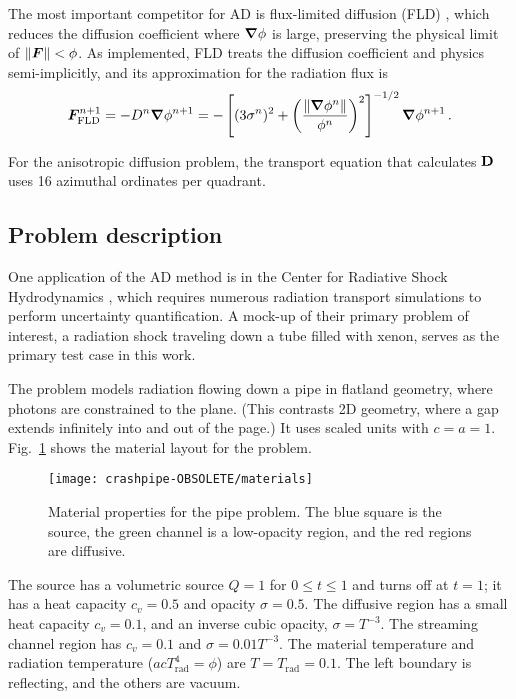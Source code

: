 \documentclass[11pt,letter,twoside]{mc2011}
\begin{document}
The most important competitor for AD is flux-limited diffusion (FLD)
\cite{Ols2000}, which
reduces the diffusion coefficient where $\bm{\nabla} \phi$ is large, preserving the
physical limit of $\left\| \bm{F} \right\| < \phi$.
As implemented, FLD treats the diffusion
coefficient and physics semi-implicitly, and its approximation for the
radiation flux is
\begin{equation*}
  \bm{F}_\text{FLD}^{n+1} = - D^{n} \bm{\nabla} \phi^{n+1}  = -\left[ (3\sigma^{n})^2
  + \left( \frac{\left\| \bm{\nabla} \phi^{n} \right\|}{\phi^{n}}  \right)^2 \right]^{-1/2}
  \bm{\nabla} \phi^{n+1}\,.
\end{equation*}

For the anisotropic diffusion problem, the transport equation that calculates
$\mathbf{D}$ uses 16 azimuthal ordinates per quadrant.
\subsection{Problem description}
One application of the AD method is in the Center for Radiative Shock
Hydrodynamics \cite{Crash2010}, which requires numerous radiation transport simulations
to perform uncertainty quantification. A mock-up of their primary problem
of interest, a radiation shock traveling down a tube filled with xenon, serves
as the primary test case in this work.

The problem models radiation flowing down a pipe in flatland geometry, where
photons are constrained to the plane. (This contrasts 2D geometry, where a gap
extends infinitely into and out of the page.) It uses scaled units with $c=a=1$. Fig.~\ref{fig:crashpipeMaterial}
shows the material layout for the problem.
\begin{figure}[htb]
  \centering
  \texttt{[image: crashpipe-OBSOLETE/materials]}
  \caption{Material properties for the pipe problem. The blue square is the
  source, the green channel is a low-opacity region, and the red regions are
  diffusive.}
  \label{fig:crashpipeMaterial}
\end{figure}
The source has a volumetric source
$Q=1$ for $0 \le t \le 1$ and turns off at $t=1$; it has a heat capacity
$c_v=0.5$ and opacity
$\sigma=0.5$. The diffusive region has a small heat capacity $c_v=0.1$, and an
inverse cubic opacity, $\sigma=T^{-3}$. The streaming channel region has
$c_v=0.1$ and $\sigma=0.01 T^{-3}$. The material temperature and radiation
temperature ($a c T_\text{rad}^4 = \phi$) are $T=T_\text{rad}=0.1$. The left
boundary is reflecting, and the others are vacuum.
\end{document}
